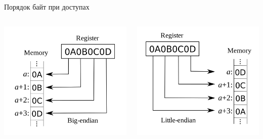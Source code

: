 \documentclass{beamer}
\begin{document}
\begin{frame}{Порядок байт при доступах}

\begin{columns}[onlytextwidth]
\begin{column}{0.5\textwidth}
\includegraphics[width=\textwidth]{./be}
\end{column}

\begin{column}{0.5\textwidth}
\includegraphics[width=\textwidth]{./le}
\end{column}
\end{columns}


\end{frame}
\end{document}
